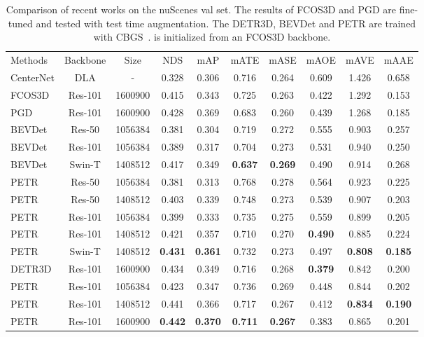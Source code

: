 \documentclass[runningheads]{llncs}
\begin{document}
\setlength{\tabcolsep}{1pt}
\begin{table}[t!]
\begin{center}
\caption{Comparison of recent works on the nuScenes val set. The results of FCOS3D and PGD are fine-tuned and tested with test time augmentation. The DETR3D, BEVDet and PETR are trained with CBGS~\cite{zhu2019class}.  is initialized from an FCOS3D backbone.
}
\label{table:1}
\begin{tabular}{l|cc|ccccccc}
\hline\noalign{\smallskip}
Methods & Backbone & Size  & NDS & mAP & mATE & mASE & mAOE & mAVE & mAAE \\

\noalign{\smallskip}
\hline
\noalign{\smallskip}
 CenterNet&DLA  &  - &0.328 &0.306 &0.716 &0.264 &0.609 &1.426 &0.658   \\
 FCOS3D &Res-101  & 1600900  &0.415 &0.343 &0.725 &0.263 &0.422 &1.292 &0.153   \\
 PGD &Res-101 & 1600900  &0.428 &0.369  &0.683 &0.260 &0.439 &1.268 &0.185  \\
\hline
BEVDet &Res-50 & 1056384 &0.381 &0.304 &0.719 &0.272 &0.555 &0.903 &0.257 \\
BEVDet &Res-101 & 1056384 &0.389 &0.317 &0.704 &0.273 &0.531 &0.940 &0.250 \\
BEVDet &Swin-T & 1408512  &0.417 &0.349 &\textbf{0.637} &\textbf{0.269} &0.490 &0.914 &0.268 \\
PETR &Res-50 & 1056384 &0.381 &0.313 &0.768 &0.278 &0.564 & 0.923 &0.225  \\
PETR &Res-50 & 1408512 &0.403 &0.339 &0.748 &0.273 &0.539 &0.907 &0.203  \\
PETR &Res-101 & 1056384 &0.399 &0.333 &0.735 &0.275 &0.559 & 0.899 &0.205  \\
PETR &Res-101 & 1408512 &0.421 &0.357 &0.710 &0.270 &\textbf{0.490} &0.885 &0.224 \\
PETR &Swin-T & 1408512 &\textbf{0.431} &\textbf{0.361} &0.732 &0.273 &0.497 &\textbf{0.808} &\textbf{0.185}  \\
\hline
DETR3D &Res-101  & 1600900  &0.434 &0.349 &0.716 &0.268 &\textbf{0.379} &0.842 &0.200 \\
PETR &Res-101 & 1056384 &0.423 &0.347 &0.736 &0.269 &0.448 & 0.844 &0.202\\PETR &Res-101 & 1408512 &0.441 &0.366 &0.717 &0.267 &0.412 & \textbf{0.834} &\textbf{0.190} \\
PETR  &Res-101 & 1600900 &\textbf{0.442} &\textbf{0.370} &\textbf{0.711} &\textbf{0.267} &0.383 &  0.865 & 0.201 \\



\hline
\end{tabular}
\end{center}
\end{table}
\setlength{\tabcolsep}{1pt}
\end{document}
